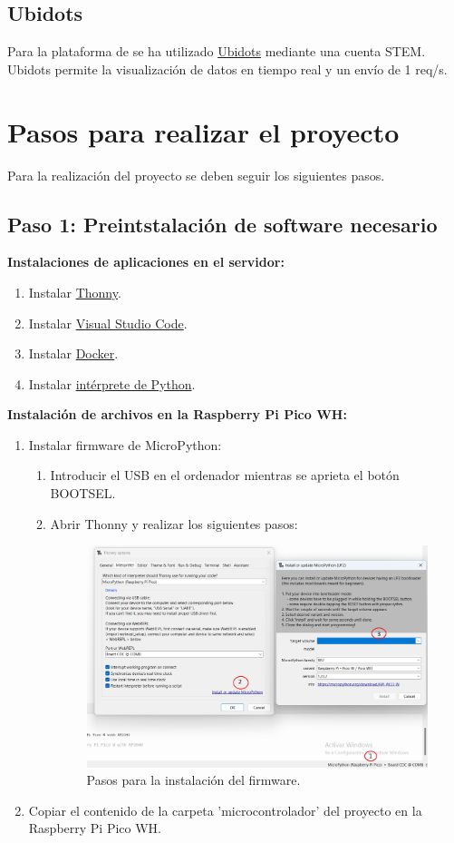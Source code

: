 \documentclass{article}
\begin{document}
\subsection{Ubidots}
Para la plataforma de se ha utilizado \href{https://stem.ubidots.com/}{Ubidots} mediante una cuenta STEM. Ubidots permite la visualización de datos en tiempo real y un envío de 1 req/s.

\section{Pasos para realizar el proyecto}
Para la realización del proyecto se deben seguir los siguientes pasos.
\subsection{Paso 1: Preintstalación de software necesario}
\textbf{Instalaciones de aplicaciones en el servidor:}
\begin{enumerate}
    \item Instalar \href{https://thonny.org/}{Thonny}.
    \item Instalar \href{https://code.visualstudio.com/download}{Visual Studio Code}.
    \item Instalar \href{https://docs.docker.com/get-docker/}{Docker}.
    \item Instalar \href{https://kinsta.com/es/base-de-conocimiento/instalar-python/}{intérprete de Python}.
\end{enumerate}


\textbf{Instalación de archivos en la Raspberry Pi Pico WH:}
\begin{enumerate}
	\item Instalar firmware de MicroPython:
		\begin{enumerate}
			\item Introducir el USB en el ordenador mientras se aprieta el botón BOOTSEL.
			\item Abrir Thonny y realizar los siguientes pasos:
			\begin{figure}[h]
			\centering
			\includegraphics[width=0.8\linewidth]{../images/instalacion_firmware.png}
			\caption{\label{fig:instalación firmware}Pasos para la instalación del firmware.}
			\end{figure}
		\end{enumerate}
			\item Copiar el contenido de la carpeta 'microcontrolador' del proyecto en la Raspberry Pi Pico WH.
\end{enumerate}
\end{document}
